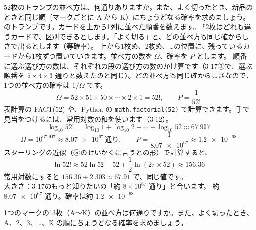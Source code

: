 \label{ph:熱-15:ex1}
\begin{phreidai}[52枚のトランプの並べ方]
52枚のトランプの並べ方は、何通りありますか。また、よく切ったとき、新品のときと同じ順（マークごとに A から K）にちょうどなる確率を求めましょう。
\phbamen
\bkhatenaref のトランプです。カードを上から1列に並べた順番を数えます。
\phmushi
52枚はどれも違うカードで、区別できるとします。「よく切る」と、どの並べ方も同じ確からしさで出るとします（等確率）。
\phzu
上から1枚め、2枚め、…の位置に、残っているカードから1枚ずつ置いていきます。並べ方の数を $\Omega$、確率を $P$ とします。
\phriyu
順番に選ぶ選び方の数は、それぞれの段の選び方の数のかけ算です（3-17③で、選ぶ順番を $5\times4\times3$ 通りと数えたのと同じ）。どの並べ方も同じ確からしさなので、1つの並べ方の確率は $1/\Omega$ です。
\phtateru
\[\Omega=52\times51\times50\times\cdots\times2\times1=52!,\qquad P=\frac{1}{52!}\]
\phtoku
表計算の FACT(52) や、Python の \texttt{math.factorial(52)} で計算できます。手で見当をつけるには、常用対数の和を使います（3-12）。
\[\log_{10}52!=\log_{10}1+\log_{10}2+\cdots+\log_{10}52\approx67.907\]
\[\Omega=10^{67.907}\approx\num{8.07e67}\ \text{通り},\qquad P=\frac{1}{\num{8.07e67}}\approx\num{1.2e-68}\]
\phtashikame
スターリングの近似（⑤のせいかくに言うとの形）で計算すると、
\[\ln52!\approx52\ln52-52+\frac{1}{2}\ln(2\pi\times52)\approx156.36\]
常用対数にすると $156.36\div2.303\approx67.91$ で、同じ値です。\\
大きさ：3-17のもっと知りたいの「約 $8\times10^{67}$ 通り」と合います。
\kotae 約 $\num{8.07e67}$ 通り。確率は約 $\num{1.2e-68}$
\end{phreidai}
\begin{jibun}
1つのマークの13枚（A〜K）の並べ方は何通りですか。また、よく切ったとき、A、2、3、…、K の順にちょうどなる確率を求めましょう。
\end{jibun}

